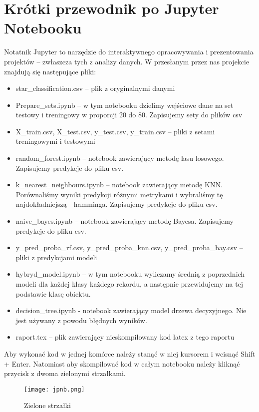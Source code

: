 \documentclass{article}
\begin{document}
\section{Krótki przewodnik po Jupyter Notebooku}
Notatnik Jupyter to narzędzie do interaktywnego opracowywania i prezentowania projektów -- zwłaszcza tych z analizy danych. \newline
W przesłanym przez nas projekcie znajdują się następujące pliki:
\begin{itemize}
    \item star\_classification.csv -- plik z oryginalnymi danymi
    \item Prepare\_sets.ipynb -- w tym notebooku dzielimy wejściowe dane na set testowy i treningowy w proporcji 20 do 80. Zapisujemy sety do plików csv
    \item X\_train.csv, X\_test.csv, y\_test.csv, y\_train.csv -- pliki z setami treningowymi i testowymi
    \item random\_forest.ipynb -- notebook zawierający metodę lasu losowego. Zapisujemy predykcje do pliku csv.
    \item k\_nearest\_neighbours.ipynb -- notebook zawierający metodę KNN. Porównaliśmy wyniki predykcji różnymi metrykami i wybraliśmy tę najdokładniejszą - hamminga.  Zapisujemy predykcje do pliku csv.
    \item naive\_bayes.ipynb -- notebook zawierający metodę Bayesa. Zapisujemy predykcje do pliku csv.
    \item y\_pred\_proba\_rf.csv, y\_pred\_proba\_knn.csv, y\_pred\_proba\_bay.csv -- pliki z predykcjami modeli
    \item hybryd\_model.ipynb -- w tym notebooku wyliczamy średnią z poprzednich modeli dla każdej klasy każdego rekordu, a następnie przewidujemy na tej podstawie klasę obiektu.
    \item decision\_tree.ipynb - notebook zawierający model drzewa decyzyjnego. Nie jest używany z powodu błędnych wyników.
    \item raport.tex -- plik zawierający nieskompilowany kod latex z tego raportu
\end{itemize}
Aby wykonać kod w jednej komórce należy stanąć w niej kursorem i wcisnąć Shift + Enter. Natomiast aby skompilować kod w całym notebooku należy kliknąć przycisk z dwoma zielonymi strzałkami.
\begin{figure}[H]
    \centering
    \texttt{[image: jpnb.png]}
    \caption{Zielone strzałki}
    \label{fig:enter-label}
\end{figure}
\end{document}
